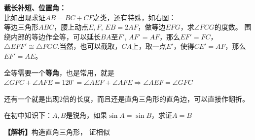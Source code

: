 \documentclass[../main.tex]{subfiles}
\begin{document}
\begin{minipage}{0.7\textwidth}
  \textbf{截长补短、位置角：} \\比如出现求证$AB=BC+CF$之类，还有特殊，如右图：\\
  等边三角形$ABC$，腰上动点$E,F$, $EB=2AF$，做等边$EFG$，求$\angle FCG$的度数。 围绕内部的等边作全等，可以延长$BA$至$F'$, $AF'=AF$，那么$EF'=FC$，$\triangle EFF' \cong \triangle FGC$.当然，也可以截取，$CA$上，取一点$E'$，使得$CE'=AF$，那么$EF'=AE$。

  全等需要一个\textbf{等角}，也是常用，就是$\angle GFC+ \angle AFE=120^{\circ} = \angle AEF + \angle AFE \Rightarrow \angle AEF= \angle GFC$
\end{minipage}
\begin{minipage}{0.3\textwidth}
  \centering
\end{minipage}

还有一个就是出现$2$倍的长度，而且还是直角三角形的直角边，可以直接作翻折。

\hrulefill

\begin{exercise}
在初中知识下：$A,B$是锐角，如果$\sin A=\sin B$，求证$A=B$
\end{exercise}
\begin{solution}
\textbf{【解析】}构造直角三角形， 证相似
\end{solution}

\hrulefill
\end{document}
